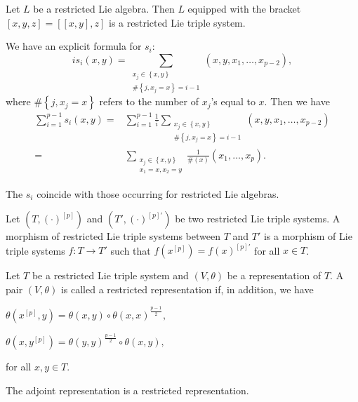 \documentclass[11pt, twoside]{article}
\begin{document}
\begin{ex}
    Let $L$ be a restricted Lie algebra. Then $L$ equipped with the bracket $[x,y,z]=[[x,y],z] $ is a restricted Lie triple system. 
\end{ex}

We have an explicit formula for  $s_i$: $$is_i(x,y)=  \sum_{\substack{x_j\in \left\{x,y \right\}\\\#\left\{j, x_j=x\right\}=i-1}}(x,y,x_1,\ldots,x_{p-2}) ,$$ where $\#\left\{j, x_j=x\right\} $ refers to the number of $x_j$'s equal to $x$. Then we have \begin{align*}
    \sum\limits_{i=1}^{p-1}s_i(x,y)= &\sum\limits_{i=1}^{p-1}\frac{1}{i}\sum_{\substack{x_j\in \left\{x,y \right\}\\\#\left\{j, x_j=x\right\}=i-1}}(x,y,x_1,\ldots,x_{p-2}) \\ =&  \sum_{\substack{x_j\in \left\{x,y \right\}\\x_1=x,x_2=y}}\frac{1}{\#(x)}(x_1,\ldots,x_p).
\end{align*}

\begin{rmq} 
The $s_i$ coincide with those occurring for restricted Lie algebras. 
\end{rmq}

\begin{defi}
    Let $(T,(\cdot)^{[p]})$ and $ (T',(\cdot)^{[p]'})$ be two restricted Lie triple systems. A morphism of restricted Lie triple systems between $T$ and $T'$ is a morphism of Lie triple systems $f:T\to T' $ such that $f(x^{[p]})=f(x)^{[p]'} $ for all $x\in T$.
\end{defi}

\begin{defi}\cite{BM26}
    Let $T$ be a restricted Lie triple system and $(V,\theta)$ be a representation of $T$. A pair $(V,\theta)$ is called a restricted representation if, in addition, we have  \begin{center}
    $\theta(x^{[p]},y)=\theta(x,y) \circ \theta(x,x)^{\frac{p-1}{2}} ,$ 
    \end{center} 
    \begin{center} 
    $\theta(x,y^{[p]})= \theta(y,y)^{\frac{p-1}{2}}\circ\theta(x,y), $
    \end{center} for all $ x, y\in T  $.
\end{defi}

\begin{ex}
    The adjoint representation is a restricted representation.
\end{ex}
\end{document}
